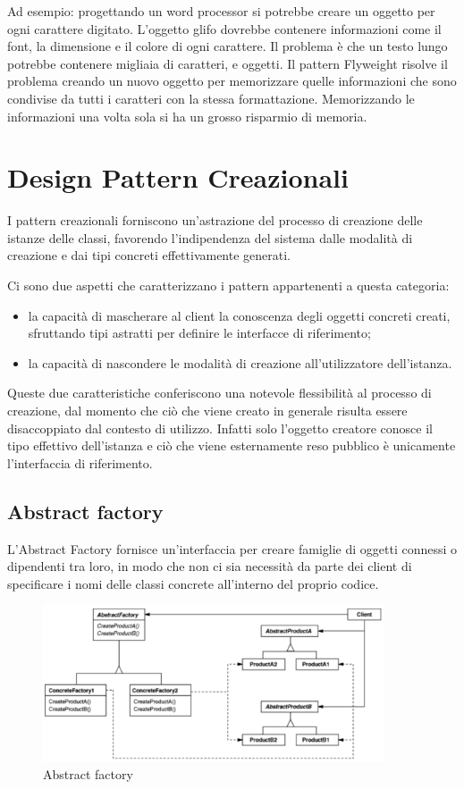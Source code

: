 Ad esempio: progettando un word processor si potrebbe creare un oggetto per ogni carattere digitato. 
L'oggetto glifo dovrebbe contenere informazioni come il font, la dimensione e il colore di ogni carattere. 
Il problema è che un testo lungo potrebbe contenere migliaia di caratteri, e oggetti. Il pattern Flyweight risolve il problema creando un nuovo oggetto per memorizzare quelle informazioni che sono condivise da tutti i caratteri con la stessa formattazione. 
Memorizzando le informazioni una volta sola si ha un grosso risparmio di memoria.

\section{Design Pattern Creazionali}
I pattern creazionali forniscono un'astrazione del processo di creazione delle istanze delle classi, favorendo l'indipendenza del sistema dalle modalità di creazione e dai tipi concreti effettivamente generati.

Ci sono due aspetti che caratterizzano i pattern appartenenti a questa categoria:
\begin{itemize}
	\item la capacità di mascherare al client la conoscenza degli oggetti concreti creati, sfruttando tipi astratti per definire le interfacce di riferimento;
	\item la capacità di nascondere le modalità di creazione all'utilizzatore dell'istanza.
\end{itemize}
Queste due caratteristiche conferiscono una notevole flessibilità al processo di creazione, dal momento che ciò che viene creato in generale risulta essere disaccoppiato dal contesto di utilizzo. 
Infatti solo l'oggetto creatore conosce il tipo effettivo dell'istanza e ciò che viene esternamente reso pubblico è unicamente l'interfaccia di riferimento.

\subsection{Abstract factory}\label{absFactory}

L'Abstract Factory fornisce un'interfaccia per creare famiglie di oggetti connessi o dipendenti tra loro, in modo che non ci sia necessità da parte dei client di specificare i nomi delle classi concrete all'interno del proprio codice.

\begin{figure}[H]
\includegraphics[width=0.9\textwidth]{res/img/DP/abstractFactory}
\caption{Abstract factory}
\end{figure}

